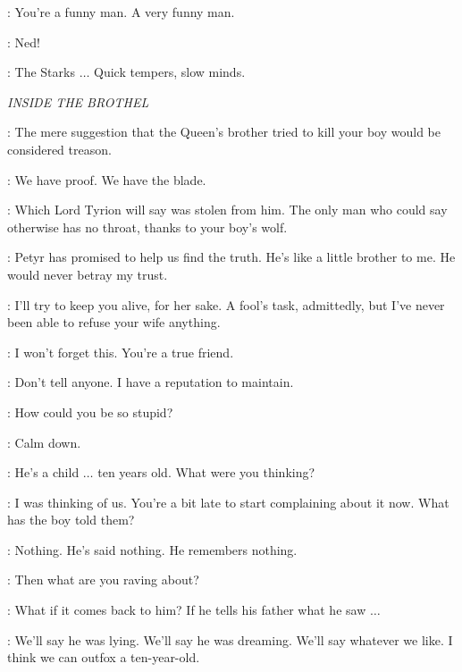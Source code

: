 
\NED: You're a funny man. A very funny man. 

\CATELYN:  Ned! 


\LITTLEFINGER:  The Starks $\ldots$ Quick tempers, slow minds. 

\scene

\textit{INSIDE THE BROTHEL}

\LITTLEFINGER: The mere suggestion that the Queen's brother tried to kill your boy would be considered treason. 

\CATELYN: We have proof. We have the blade. 

\LITTLEFINGER: Which Lord Tyrion will say was stolen from him. The only man who could say otherwise has no throat, thanks to your boy's wolf. 

\CATELYN: Petyr has promised to help us find the truth. He's like a little brother to me. He would never betray my trust. 

\LITTLEFINGER: I'll try to keep you alive, for her sake. A fool's task, admittedly, but I've never been able to refuse your wife anything. 

\CATELYN: I won't forget this. You're a true friend. 

\LITTLEFINGER: Don't tell anyone. I have a reputation to maintain. 

\scene



\CERSEI: How could you be so stupid? 

\JAIME: Calm down. 

\CERSEI: He's a child $\ldots$ ten years old. What were you thinking? 

\JAIME: I was thinking of us. You're a bit late to start complaining about it now. What has the boy told them? 

\CERSEI: Nothing. He's said nothing. He remembers nothing. 

\JAIME: Then what are you raving about? 

\CERSEI: What if it comes back to him? If he tells his father what he saw $\ldots$ 

\JAIME: We'll say he was lying. We'll say he was dreaming. We'll say whatever we like. I think we can outfox a ten-year-old. 

